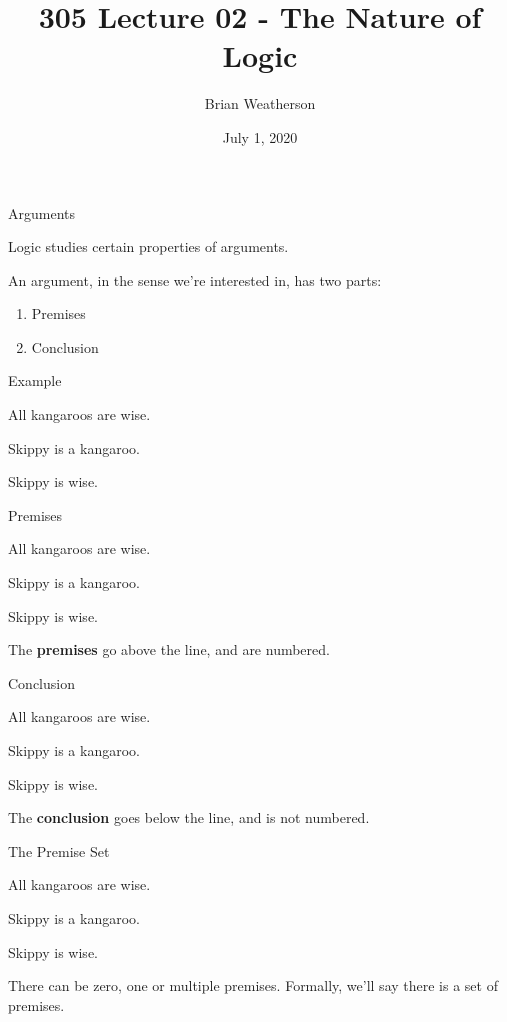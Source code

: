 \documentclass[
  ignorenonframetext,
]{beamer}
\title{305 Lecture 02 - The Nature of Logic}
\author{Brian Weatherson}
\date{July 1, 2020}
\providecommand{\tightlist}{%
  \setlength{\itemsep}{0pt}\setlength{\parskip}{0pt}}
\renewcommand{\,}{\text{, }}
\renewenvironment*{quote}	
	{\list{}{\rightmargin   \leftmargin} \item } 	
	{\endlist }
\newcommand{\DisplayArg}[2]{
\begin{enumerate}
{#1}
\end{enumerate}
\vspace{-6pt}
\hrulefill

\begin{quote}
{\normalfont #2}
\end{quote}
\vspace{12pt}
}
\begin{document}
\frame{\titlepage}

\begin{frame}{Arguments}
\protect\hypertarget{arguments}{}

Logic studies certain properties of arguments.

An argument, in the sense we're interested in, has two parts:

\begin{enumerate}
\tightlist
\item
  Premises
\item
  Conclusion
\end{enumerate}

\end{frame}

\begin{frame}{Example}
\protect\hypertarget{example}{}

\DisplayArg{ \item All kangaroos are wise. \item Skippy is a kangaroo. } { Skippy is wise. }

\end{frame}

\begin{frame}{Premises}
\protect\hypertarget{premises}{}

\DisplayArg{ \item All kangaroos are wise. \item Skippy is a kangaroo. } { Skippy is wise. }

The \textbf{premises} go above the line, and are numbered.

\end{frame}

\begin{frame}{Conclusion}
\protect\hypertarget{conclusion}{}

\DisplayArg{ \item All kangaroos are wise. \item Skippy is a kangaroo. } { Skippy is wise. }

The \textbf{conclusion} goes below the line, and is not numbered.

\end{frame}

\begin{frame}{The Premise Set}
\protect\hypertarget{the-premise-set}{}

\DisplayArg{ \item All kangaroos are wise. \item Skippy is a kangaroo. } { Skippy is wise. }

There can be zero, one or multiple premises. Formally, we'll say there
is a set of premises.

\end{frame}
\end{document}

